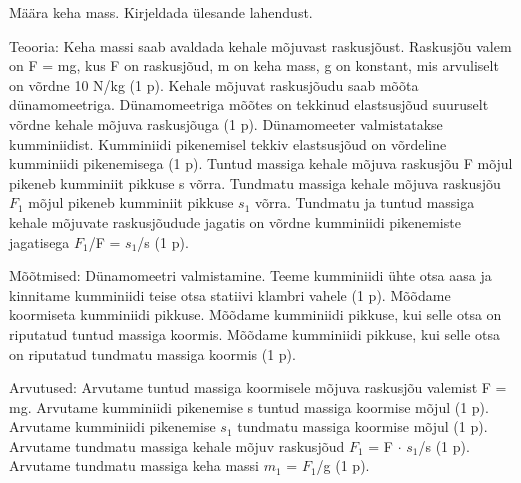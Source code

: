 
Määra keha mass. Kirjeldada ülesande lahendust.

\hint

\solu
Teooria: Keha massi saab avaldada kehale mõjuvast raskusjõust. Raskusjõu valem on F = mg, kus F on raskusjõud, m on keha mass, g on konstant, mis arvuliselt on võrdne 10 N/kg (1 p). Kehale mõjuvat raskusjõudu saab mõõta dünamomeetriga. Dünamomeetriga mõõtes on tekkinud elastsusjõud suuruselt võrdne kehale mõjuva raskusjõuga (1 p). Dünamomeeter valmistatakse kumminiidist. Kumminiidi pikenemisel tekkiv elastsusjõud on võrdeline kumminiidi pikenemisega (1 p). Tuntud massiga kehale mõjuva raskusjõu F mõjul pikeneb kumminiit pikkuse s võrra. Tundmatu massiga kehale mõjuva raskusjõu $F_1$ mõjul pikeneb kumminiit pikkuse $s_1$ võrra. Tundmatu ja tuntud massiga kehale mõjuvate raskusjõudude jagatis on võrdne kumminiidi pikenemiste jagatisega $F_1$/F = $s_1$/s (1 p).

Mõõtmised: Dünamomeetri valmistamine. Teeme kumminiidi ühte otsa aasa ja kinnitame kumminiidi teise otsa statiivi klambri vahele (1 p). Mõõdame koormiseta kumminiidi pikkuse. Mõõdame kumminiidi pikkuse, kui selle otsa on riputatud tuntud massiga koormis. Mõõdame kumminiidi pikkuse, kui selle otsa on riputatud tundmatu massiga koormis (1 p).

Arvutused: Arvutame tuntud massiga koormisele mõjuva raskusjõu valemist F = mg. Arvutame kumminiidi pikenemise s tuntud massiga koormise mõjul (1 p). Arvutame kumminiidi pikenemise $s_1$ tundmatu massiga koormise mõjul (1 p). Arvutame tundmatu massiga kehale mõjuv raskusjõud $F_1$ = F $\cdot$ $s_1$/s (1 p). Arvutame tundmatu massiga keha massi $m_1$ = $F_1$/g (1 p).
\probend
